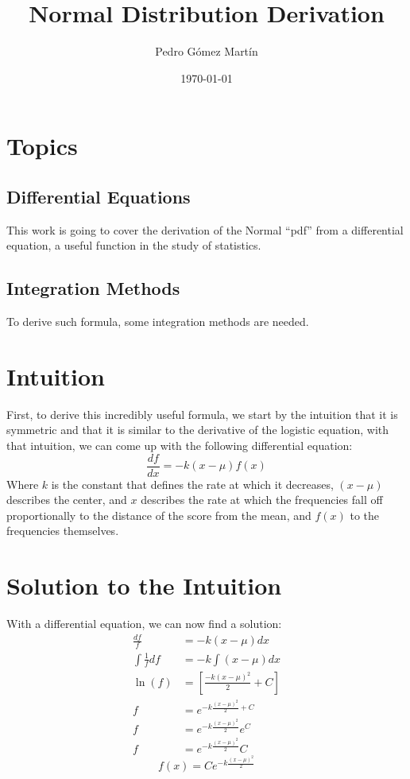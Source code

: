 \documentclass{article}
\author{Pedro G\'{o}mez Mart\'{i}n}
\date{\today}
\title{Normal Distribution Derivation}
\begin{document}
\maketitle
\tableofcontents

\section{Topics}
\subsection{Differential Equations}
This work is going to cover the derivation of the Normal ``pdf'' from a
differential equation, a useful function in the study of statistics.
\subsection{Integration Methods}
To derive such formula, some integration methods are needed.
\section{Intuition}

First, to derive this incredibly useful formula, we start by the intuition that
it is symmetric and that it is similar to the derivative of the logistic
equation, with that intuition, we can come up with the following differential
equation:
\begin{equation}
  \label{eq:Differential equation intuition}
  \frac{df}{dx}=-k(x-\mu)f(x)
\end{equation}
Where $k$ is the constant that defines the rate at which it decreases, $(x-\mu)$
describes the center, and $x$ describes the rate at which the frequencies
fall off proportionally to the distance of the score from the mean, and $f(x)$
to the frequencies themselves.

\section{Solution to the Intuition}
With a differential equation, we can now find a solution:
\begin{align}
  \frac{df}{f}&=-k(x-\mu)dx\\
  \int\frac{1}{f}df&=-k\int (x-\mu)dx\\
  \ln (f)&=\left[ \frac{-k(x-\mu)^2}{2} +C \right]\\
  f&=e^{-k\frac{\left(x-\mu\right)^2}{2}+C}\\
  f&=e^{-k\frac{\left(x-\mu\right)^2}{2}}e^C\\
  f&=e^{-k\frac{\left(x-\mu\right)^2}{2}}C
\end{align}
\begin{equation*}
  \label{eq:General Solution}
  f(x)=Ce^{-k\frac{\left(x-\mu\right)^2}{2}}
\end{equation*}
\end{document}

